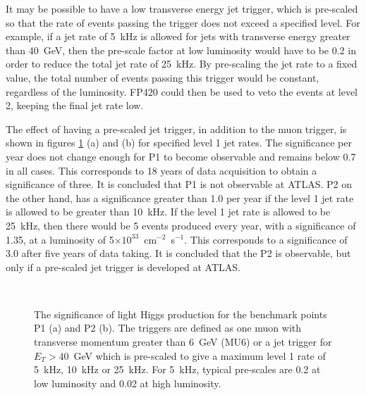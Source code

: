 It may be possible to have a low transverse energy jet trigger, which is pre-scaled so that the rate of events passing the trigger does not exceed a specified level.  For example, if a jet rate of 5~kHz is allowed for jets with transverse energy greater than 40~GeV, then the pre-scale factor at low luminosity would have to be 0.2 in order to reduce the total jet rate of 25~kHz. By pre-scaling the jet rate to a fixed value, the total number of events passing this trigger would be constant, regardless of the luminosity. FP420 could then be used to veto the events at level 2, keeping the final jet rate low.

The effect of having a pre-scaled jet trigger, in addition to the muon trigger, is shown in figures \ref{MSSMsig} (a) and (b) for specified level 1 jet rates. The significance per year does not change enough for P1 to become observable and remains below 0.7 in all cases. This corresponds to 18 years of data acquisition to obtain a significance of three. It is concluded that P1 is not observable at ATLAS. P2 on the other hand, has a significance greater than 1.0 per year if the level 1 jet rate is allowed to be greater than 10~kHz. If the level 1 jet rate is allowed to be 25~kHz, then there would be 5 events produced every year, with a significance of 1.35, at a luminosity of 5$\times10^{33}$~cm$^{-2}$~s$^{-1}$. This corresponds to a significance of 3.0 after five years of data taking. It is concluded that the P2 is observable, but only if a pre-scaled jet trigger is developed at  ATLAS.

\begin{figure}
\centering
\mbox{
	\quad
	}
\caption[The significance of MSSM Higgs production in the intense coupling region after proposed ATLAS triggers]{ The significance of light Higgs production for the benchmark points P1 (a) and P2 (b).  
The triggers are defined as one muon with transverse momentum greater than 6~GeV (MU6) or a jet trigger for $E_T> 40$~GeV which is pre-scaled to give a maximum level 1 rate of 5~kHz, 10~kHz or 25~kHz. For 5~kHz, typical pre-scales are 0.2 at low luminosity and 0.02 at high luminosity.
\label{MSSMsig}}
\end{figure}


